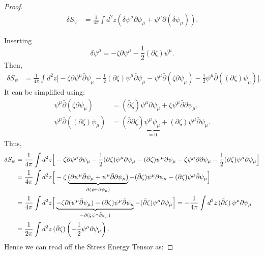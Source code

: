 \begin{tcolorbox}[breakable]
\begin{proof}
		
		\begin{align}
			\delta S_\psi &= \frac{1}{4\pi} \int d^2z \left(
			\delta \psi^\mu \bar\partial \psi_\mu + \psi^\mu \bar\partial(\delta \psi_\mu)
			\right).
		\end{align}
		
		Inserting
		\begin{equation}
			\delta \psi^\mu = -\zeta \partial \psi^\mu - \frac{1}{2}(\partial \zeta)\psi^\mu.
		\end{equation}
		Then,
		\begin{align}
			\delta S_\psi &= \frac{1}{4\pi} \int d^2z \Big[
			-\zeta \partial \psi^\mu \bar\partial \psi_\mu
			-\frac{1}{2}(\partial \zeta)\psi^\mu \bar\partial \psi_\mu - \psi^\mu \bar\partial(\zeta \partial \psi_\mu)
			-\frac{1}{2}\psi^\mu \bar\partial((\partial \zeta)\psi_\mu)
			\Big].
		\end{align}
		It can be simplified using:
		\begin{align}
			\psi^\mu \bar\partial(\zeta \partial \psi_\mu)
			&= (\bar\partial \zeta)\psi^\mu \partial \psi_\mu
			+ \zeta \psi^\mu \bar\partial \partial \psi_\mu,\\
			\psi^\mu \bar\partial((\partial \zeta)\psi_\mu)
			&= (\bar\partial\partial \zeta)\underbrace{\psi^\mu  \psi_\mu}_{=0}+(\partial \zeta)\psi^\mu \bar\partial \psi_\mu.
		\end{align}
		Thus,
		\begin{align}
			\delta S_\psi &=\frac{1}{4\pi} \int d^2z \Big[
			-\zeta \partial \psi^\mu \bar\partial \psi_\mu
			-\frac{1}{2}(\partial \zeta)\psi^\mu \bar\partial \psi_\mu -(\bar\partial \zeta)\psi^\mu \partial \psi_\mu- \zeta \psi^\mu \bar\partial \partial \psi_\mu
			-\frac{1}{2}(\partial \zeta)\psi^\mu \bar\partial \psi_\mu
			\Big]\notag\\ 
			&=\frac{1}{4\pi} \int d^2z \Big[
			-\zeta\underbrace{(\partial \psi^\mu \bar\partial \psi_\mu + \psi^\mu \bar\partial \partial \psi_\mu)}_{\partial(\psi^\mu \bar\partial \psi_\mu)}-(\bar\partial \zeta)\psi^\mu \partial \psi_\mu
			- (\partial \zeta)\psi^\mu \bar\partial \psi_\mu
			\Big]\notag\\
			&=\frac{1}{4\pi} \int d^2z \Big[
			\underbrace{-\zeta\partial(\psi^\mu \bar\partial \psi_\mu)- (\partial \zeta)\psi^\mu \bar\partial \psi_\mu}_{-\partial(\zeta\psi^\mu \bar\partial \psi_\mu)}
			-(\bar\partial \zeta)\psi^\mu \partial \psi_\mu
			\Big]= -\frac{1}{4\pi} \int d^2z\, (\bar\partial \zeta)\, \psi^\mu \partial \psi_\mu\notag\\
			&= \frac{1}{2\pi} \int d^2z\, (\bar\partial \zeta)\left(-\frac{1}{2}\psi^\mu \partial \psi_\mu\right).
		\end{align}
		Hence we can read off the Stress Energy Tensor as:
		

\end{proof}
\end{tcolorbox}
